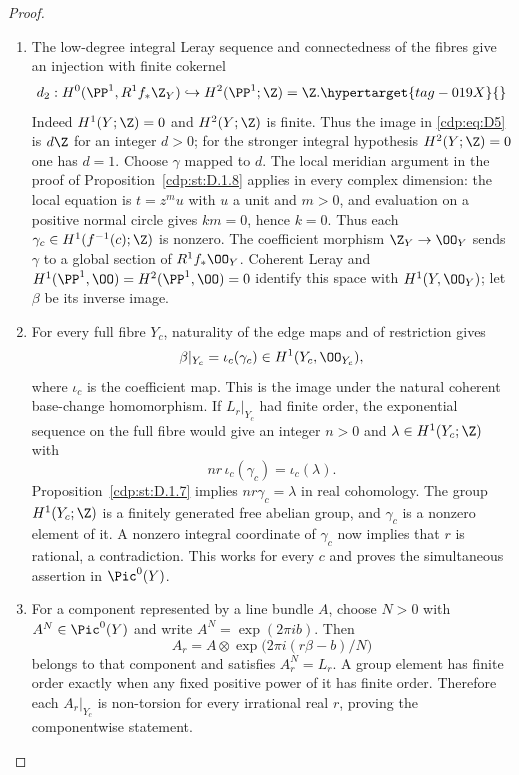 \begin{proof}

\begin{enumerate}[leftmargin=*]
\item The low-degree integral Leray sequence and connectedness of the
fibres give an injection with finite cokernel
\begin{equation}
d_2:H^0(\PP^1,R^1f_*\Z_Y)
 \hookrightarrow H^2(\PP^1;\Z)=\Z.                   \hypertarget{tag-019X}{}\label{cdp:eq:D5}
\end{equation}
Indeed $H^1(Y;\Z)=0$ and $H^2(Y;\Z)$ is finite.
Thus the image in \eqref{cdp:eq:D5} is $d\Z$ for an integer $d>0$; for the
stronger integral hypothesis $H^2(Y;\Z)=0$ one has $d=1$.
Choose $\gamma$ mapped to $d$. The local meridian argument in
the proof of Proposition~\ref{cdp:st:D.1.8} applies in every complex
dimension: the local equation is $t=z^m u$ with $u$ a unit and $m>0$,
and evaluation on a positive normal circle gives $km=0$, hence $k=0$.
Thus each $\gamma_c\in H^1(f^{-1}(c);\Z)$ is nonzero.
The coefficient morphism $\Z_Y\to\OO_Y$ sends $\gamma$ to a
global section of $R^1f_*\OO_Y$. Coherent Leray and
$H^1(\PP^1,\OO)=H^2(\PP^1,\OO)=0$ identify this space with
$H^1(Y,\OO_Y)$; let $\beta$ be its inverse image.

\item For every full fibre $Y_c$, naturality of the edge maps and of
restriction gives
\[
\beta|_{Y_c}=\iota_c(\gamma_c)\in H^1(Y_c,\OO_{Y_c}), 
\]
where $\iota_c$ is the coefficient map. This is the image under the natural coherent base-change
homomorphism. If $L_r|_{Y_c}$ had finite order, the exponential
sequence on the full fibre would give an integer $n>0$ and
$\lambda\in H^1(Y_c;\Z)$ with
\[
nr\,\iota_c(\gamma_c)=\iota_c(\lambda).
\]
Proposition~\ref{cdp:st:D.1.7} implies $nr\gamma_c=\lambda$ in real cohomology.
The group $H^1(Y_c;\Z)$ is a finitely generated free abelian group,
and $\gamma_c$ is a nonzero element of it. A nonzero integral
coordinate of $\gamma_c$ now implies that $r$ is rational, a
contradiction. This works for every $c$ and proves the simultaneous
assertion in $\Pic^0(Y)$.

\item For a component represented by a line bundle $A$, choose $N>0$
with $A^N\in\Pic^0(Y)$ and write $A^N=\exp(2\pi i b)$.
Then
\[
A_r=A\otimes\exp\bigl(2\pi i(r\beta-b)/N\bigr)
\]
belongs to that component and satisfies $A_r^N=L_r$. A group
element has finite order exactly when any fixed positive power of
it has finite order. Therefore each $A_r|_{Y_c}$ is non-torsion
for every irrational real $r$, proving the componentwise statement.

\end{enumerate}
\end{proof}